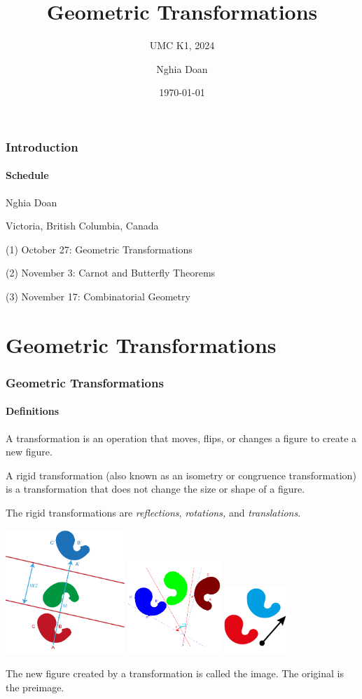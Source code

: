 \documentclass[8pt,xcolor=table,dvipsnames]{beamer}
\title{Geometric Transformations}
\subtitle{UMC K1, 2024}
\author{Nghia Doan}
\institute{MCC Club \& Competitions}
\date{\today}
\begin{document}
\begin{frame}[t]
    \frametitle{Introduction}
    \framesubtitle{Schedule}
    \bigbreak
    Nghia Doan
    
    \bigbreak
    Victoria, British Columbia, Canada

    \bigbreak
    (1) October 27: Geometric Transformations

    \bigbreak
    (2) November 3: Carnot and Butterfly Theorems

    \bigbreak
    (3) November 17: Combinatorial Geometry
\end{frame}

\section{Geometric Transformations}

\begin{frame}[t]
    \frametitle{Geometric Transformations}
    \framesubtitle{Definitions}
    A transformation is an operation that moves, flips, or changes a figure to create a new figure.

    \bigbreak
    A rigid transformation (also known as an isometry or congruence transformation)
    is a transformation that does not change the size or shape of a figure.
    
    \bigbreak
    The rigid transformations are \textit{reflections}, \textit{rotations,} and \textit{translations}.

    \begin{center}
        \includegraphics[width=4.5cm]{./svg/pdf/geo-reflection.pdf}
        \qquad
        \includegraphics[width=3.5cm]{./svg/pdf/geo-rotation.pdf}
        \qquad
        \includegraphics[width=2.5cm]{./svg/pdf/geo-translation.pdf}
    \end{center}

    The new figure created by a transformation is called the image. The original is the preimage.
\end{frame}
\end{document}
